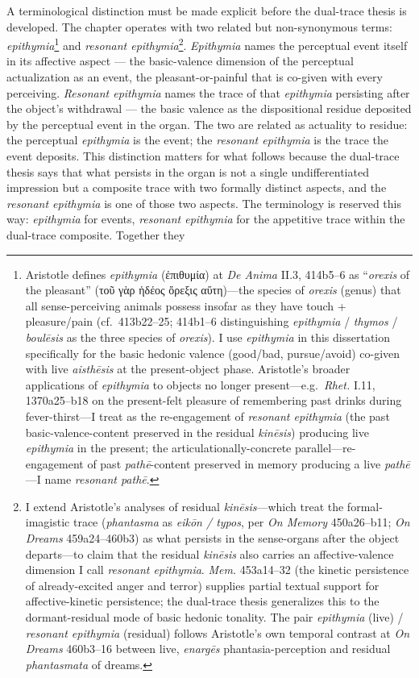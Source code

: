 \documentclass{article}
\newcommand{\gk}[1]{{\greekfont #1}}
\begin{document}
A terminological distinction must be made explicit before the dual-trace thesis is developed. The chapter operates with two related but non-synonymous terms: \textit{epithymia}\footnote{Aristotle defines \textit{epithymia} (\gk{ἐπιθυμία}) at \textit{De Anima} II.3, 414b5--6 as ``\textit{orexis} of the pleasant'' (\gk{τοῦ γὰρ ἡδέος ὄρεξις αὕτη})---the species of \textit{orexis} (genus) that all sense-perceiving animals possess insofar as they have touch + pleasure/pain (cf.\ 413b22--25; 414b1--6 distinguishing \textit{epithymia} / \textit{thymos} / \textit{boulēsis} as the three species of \textit{orexis}). I use \textit{epithymia} in this dissertation specifically for the basic hedonic valence (good/bad, pursue/avoid) co-given with live \textit{aisthēsis} at the present-object phase. Aristotle's broader applications of \textit{epithymia} to objects no longer present---e.g.\ \textit{Rhet.} I.11, 1370a25--b18 on the present-felt pleasure of remembering past drinks during fever-thirst---I treat as the re-engagement of \textit{resonant epithymia} (the past basic-valence-content preserved in the residual \textit{kinēsis}) producing live \textit{epithymia} in the present; the articulationally-concrete parallel---re-engagement of past \textit{pathē}-content preserved in memory producing a live \textit{pathē}---I name \textit{resonant pathē}.} and \textit{resonant epithymia}\footnote{I extend Aristotle's analyses of residual \textit{kinēsis}---which treat the formal-imagistic trace (\textit{phantasma} as \textit{eikōn / typos}, per \textit{On Memory} 450a26--b11; \textit{On Dreams} 459a24--460b3) as what persists in the sense-organs after the object departs---to claim that the residual \textit{kinēsis} also carries an affective-valence dimension I call \textit{resonant epithymia}. \textit{Mem.} 453a14--32 (the kinetic persistence of already-excited anger and terror) supplies partial textual support for affective-kinetic persistence; the dual-trace thesis generalizes this to the dormant-residual mode of basic hedonic tonality. The pair \textit{epithymia} (live) / \textit{resonant epithymia} (residual) follows Aristotle's own temporal contrast at \textit{On Dreams} 460b3--16 between live, \textit{enargēs} phantasia-perception and residual \textit{phantasmata} of dreams.}. \textit{Epithymia} names the perceptual event itself in its affective aspect --- the basic-valence dimension of the perceptual actualization as an event, the pleasant-or-painful that is co-given with every perceiving. \textit{Resonant epithymia} names the trace of that \textit{epithymia} persisting after the object's withdrawal --- the basic valence as the dispositional residue deposited by the perceptual event in the organ. The two are related as actuality to residue: the perceptual \textit{epithymia} is the event; the \textit{resonant epithymia} is the trace the event deposits. This distinction matters for what follows because the dual-trace thesis says that what persists in the organ is not a single undifferentiated impression but a composite trace with two formally distinct aspects, and the \textit{resonant epithymia} is one of those two aspects. The terminology is reserved this way: \textit{epithymia} for events, \textit{resonant epithymia} for the appetitive trace within the dual-trace composite. Together they 
\end{document}
